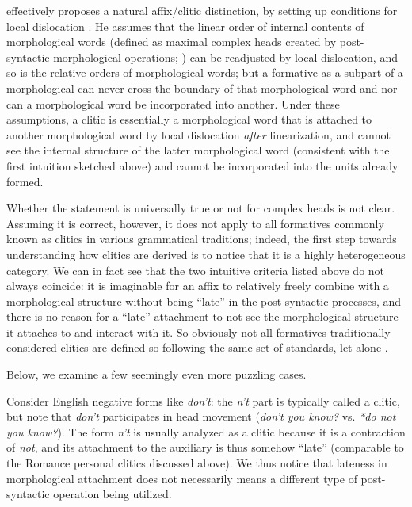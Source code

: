 \documentclass[a4paper, oneside, scheme=plain, 12pt]{article}
\newcommand{\form}[1]{\emph{#1}}
\begin{document}
\citet{embick2007linearization} effectively proposes a natural affix/clitic distinction, 
by setting up conditions for local dislocation \citep{harley1999distributed}.
He assumes that the linear order of internal contents of morphological words (defined as maximal complex heads created by post-syntactic morphological operations; ) can be readjusted by local dislocation, and so is the relative orders of morphological words;
but a formative as a subpart of a morphological can never cross the boundary of that morphological word and nor can a morphological word be incorporated into another.
Under these assumptions, a clitic is essentially a morphological word that is attached to another morphological word by local dislocation \emph{after} linearization, and cannot see the internal structure of the latter morphological word (consistent with the first intuition sketched above) and cannot be incorporated into the units already formed.

Whether the statement is universally true or not for complex heads is not clear.
Assuming it is correct, however,
it does not apply to all formatives commonly known as clitics in various grammatical traditions;
indeed, the first step towards understanding how clitics are derived is to notice that it is a highly heterogeneous category.
We can in fact see that the two intuitive criteria listed above do not always coincide: it is imaginable for an affix to relatively freely combine with a morphological structure without being ``late'' in the post-syntactic processes, and  there is no reason for a ``late'' attachment to not see the morphological structure it attaches to and interact with it.
So obviously not all formatives traditionally considered clitics are defined so following the same set of standards, let alone \citet{embick2007linearization}.

Below, we examine a few seemingly even more puzzling cases.

Consider English negative forms like \form{don't}: the \form{n't} part is typically called a clitic, but note that \form{don't} participates in head movement (\form{don't you know?} vs. \form{*do not you know?}).
The form \form{n't} is usually analyzed as a clitic because it is a contraction of \form{not}, and its attachment to the auxiliary is thus somehow ``late'' (comparable to the Romance personal clitics discussed above).
We thus notice that lateness in morphological attachment does not necessarily means a different type of post-syntactic operation being utilized.
\end{document}
